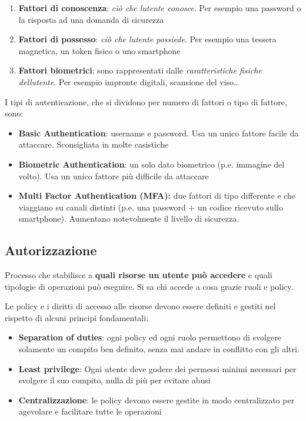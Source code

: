 \begin{enumerate}
\def\labelenumi{\arabic{enumi}.}
\item
  \textbf{Fattori di conoscenza}: \emph{ciò che l\textquotesingle utente
  conosce}. Per esempio una password o la risposta ad una domanda di
  sicurezza
\item
  \textbf{Fattori di possesso}: \emph{ciò che l\textquotesingle utente
  possiede}. Per esempio una tessera magnetica, un token fisico o uno
  smartphone
\item
  \textbf{Fattori biometrici}: sono rappresentati dalle
  \emph{caratteristiche fisiche dell\textquotesingle utente}. Per
  esempio impronte digitali, scansione del viso\ldots{}
\end{enumerate}

I tipi di autenticazione, che si dividono per numero di fattori o tipo
di fattore, sono:

\begin{itemize}
\item
  \textbf{Basic Authentication}: username e password. Usa un unico
  fattore facile da attaccare. Sconsigliata in molte casistiche
\item
  \textbf{Biometric Authentication}: un solo dato biometrico (p.e.
  immagine del volto). Usa un unico fattore più difficile da attaccare
\item
  \textbf{Multi Factor Authentication (MFA):} due fattori di tipo
  differente e che viaggiano su canali distinti (p.e. una password + un
  codice ricevuto sullo smartphone). Aumentano notevolmente il livello
  di sicurezza.
\end{itemize}

\subsection{Autorizzazione}\label{autorizzazione}

Processo che stabilisce a \textbf{quali risorse un utente può accedere}
e quali tipologie di operazioni può eseguire. Si sa chi accede a cosa
grazie ruoli e policy.

Le policy e i diritti di accesso alle risorse devono essere definiti e
gestiti nel rispetto di alcuni principi fondamentali:

\begin{itemize}
\item
  \textbf{Separation of duties}: ogni policy ed ogni ruolo permettono di
  svolgere solamente un compito ben definito, senza mai andare in
  conflitto con gli altri.
\item
  \textbf{Least privilege}: Ogni utente deve godere dei permessi minimi
  necessari per svolgere il suo compito, nulla di più per evitare abusi
\item
  \textbf{Centralizzazione}: le policy devono essere gestite in modo
  centralizzato per agevolare e facilitare tutte le operazioni
\end{itemize}

